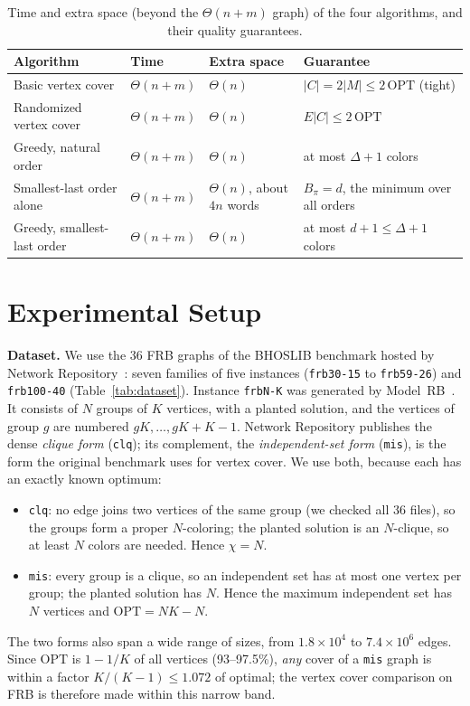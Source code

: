 \documentclass[acmsmall,nonacm]{acmart}
\newcommand{\code}[1]{\texttt{#1}}
\newcommand{\OPT}{\mathrm{OPT}}
\begin{document}
\begin{table}[t]
\caption{Time and extra space (beyond the $\Theta(n+m)$ graph) of the four algorithms, and their quality guarantees.}
\label{tab:complexity}
\small
\begin{tabular}{@{}llll@{}}
\toprule
Algorithm & Time & Extra space & Guarantee \\
\midrule
Basic vertex cover & $\Theta(n+m)$ & $\Theta(n)$ & $|C|=2|M|\le2\,\OPT$ (tight) \\
Randomized vertex cover & $\Theta(n+m)$ & $\Theta(n)$ & $E|C|\le2\,\OPT$ \\
Greedy, natural order & $\Theta(n+m)$ & $\Theta(n)$ & at most $\Delta+1$ colors \\
Smallest-last order alone & $\Theta(n+m)$ & $\Theta(n)$, about $4n$ words & $B_\pi=d$, the minimum over all orders \\
Greedy, smallest-last order & $\Theta(n+m)$ & $\Theta(n)$ & at most $d+1\le\Delta+1$ colors \\
\bottomrule
\end{tabular}
\end{table}

\section{Experimental Setup}
\label{sec:setup}

\textbf{Dataset.} We use the 36 FRB graphs of the BHOSLIB benchmark hosted by
Network Repository~\cite{rossi2015}: seven families of five instances
(\code{frb30-15} to \code{frb59-26}) and \code{frb100-40}
(Table~\ref{tab:dataset}). Instance \code{frbN-K} was generated by
Model~RB~\cite{xu2000,xu2007}. It consists of $N$ groups of $K$ vertices, with
a planted solution, and the vertices of group $g$ are numbered $gK,\ldots,gK+K-1$.
Network Repository publishes the dense \emph{clique form} (\code{clq}); its
complement, the \emph{independent-set form} (\code{mis}), is the form the
original benchmark uses for vertex cover. We use both, because each has an
exactly known optimum:
\begin{itemize}
  \item \code{clq}: no edge joins two vertices of the same group (we checked all 36 files), so the groups form a proper $N$-coloring; the planted solution is an $N$-clique, so at least $N$ colors are needed. Hence $\chi=N$.
  \item \code{mis}: every group is a clique, so an independent set has at most one vertex per group; the planted solution has $N$. Hence the maximum independent set has $N$ vertices and $\OPT=NK-N$.
\end{itemize}
The two forms also span a wide range of sizes, from $1.8\times10^4$ to
$7.4\times10^6$ edges. Since $\OPT$ is $1-1/K$ of all vertices (93--97.5\%),
\emph{any} cover of a \code{mis} graph is within a factor $K/(K-1)\le1.072$
of optimal; the vertex cover comparison on FRB is therefore made within this
narrow band.
\end{document}

